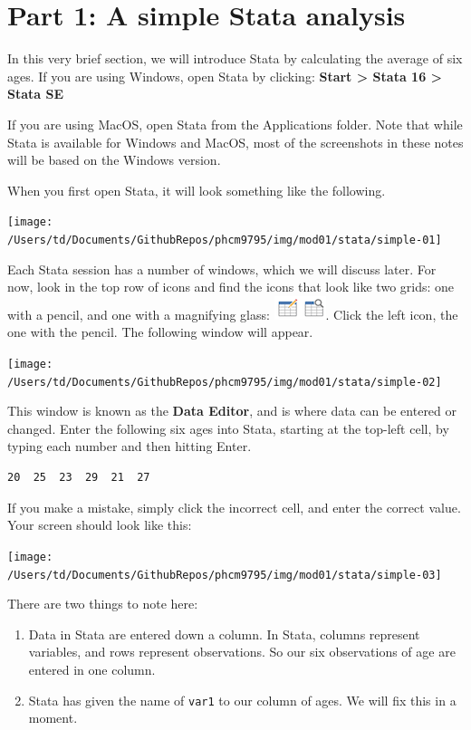 \documentclass[
]{memoir}
\providecommand{\tightlist}{%
  \setlength{\itemsep}{0pt}\setlength{\parskip}{0pt}}
\begin{document}
\hypertarget{part-1-a-simple-stata-analysis}{%
\section*{Part 1: A simple Stata analysis}\label{part-1-a-simple-stata-analysis}}

In this very brief section, we will introduce Stata by calculating the average of six ages. If you are using Windows, open Stata by clicking: \textbf{Start \textgreater{} Stata 16 \textgreater{} Stata SE}

If you are using MacOS, open Stata from the Applications folder. Note that while Stata is available for Windows and MacOS, most of the screenshots in these notes will be based on the Windows version.

When you first open Stata, it will look something like the following.

\texttt{[image: /Users/td/Documents/GithubRepos/phcm9795/img/mod01/stata/simple-01]}

Each Stata session has a number of windows, which we will discuss later. For now, look in the top row of icons and find the icons that look like two grids: one with a pencil, and one with a magnifying glass: \includegraphics{img/mod01/stata/data-browser-icons.png}. Click the left icon, the one with the pencil. The following window will appear.

\texttt{[image: /Users/td/Documents/GithubRepos/phcm9795/img/mod01/stata/simple-02]}

This window is known as the \textbf{Data Editor}, and is where data can be entered or changed. Enter the following six ages into Stata, starting at the top-left cell, by typing each number and then hitting Enter.

\begin{verbatim}
20  25  23  29  21  27
\end{verbatim}

If you make a mistake, simply click the incorrect cell, and enter the correct value. Your screen should look like this:

\texttt{[image: /Users/td/Documents/GithubRepos/phcm9795/img/mod01/stata/simple-03]}

There are two things to note here:

\begin{enumerate}
\def\labelenumi{\arabic{enumi}.}
\tightlist
\item
  Data in Stata are entered down a column. In Stata, columns represent variables, and rows represent observations. So our six observations of age are entered in one column.
\item
  Stata has given the name of \texttt{var1} to our column of ages. We will fix this in a moment.
\end{enumerate}
\end{document}
